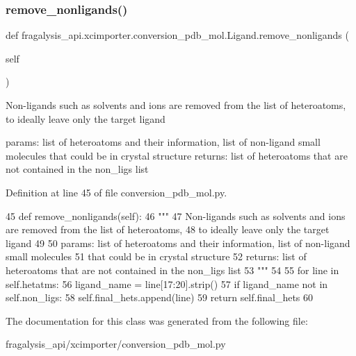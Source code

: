 \subsubsection{\texorpdfstring{remove\+\_\+nonligands()}{remove\_nonligands()}}
{\footnotesize\ttfamily def fragalysis\+\_\+api.\+xcimporter.\+conversion\+\_\+pdb\+\_\+mol.\+Ligand.\+remove\+\_\+nonligands (\begin{DoxyParamCaption}\item[{}]{self }\end{DoxyParamCaption})}

\begin{DoxyVerb}Non-ligands such as solvents and ions are removed from the list of heteroatoms,
to ideally leave only the target ligand

params: list of heteroatoms and their information, list of non-ligand small molecules
    that could be in crystal structure
returns: list of heteroatoms that are not contained in the non_ligs list
\end{DoxyVerb}
 

Definition at line 45 of file conversion\+\_\+pdb\+\_\+mol.\+py.


\begin{DoxyCode}
45     \textcolor{keyword}{def }remove\_nonligands(self):
46         \textcolor{stringliteral}{"""}
47 \textcolor{stringliteral}{        Non-ligands such as solvents and ions are removed from the list of heteroatoms,}
48 \textcolor{stringliteral}{        to ideally leave only the target ligand}
49 \textcolor{stringliteral}{}
50 \textcolor{stringliteral}{        params: list of heteroatoms and their information, list of non-ligand small molecules}
51 \textcolor{stringliteral}{            that could be in crystal structure}
52 \textcolor{stringliteral}{        returns: list of heteroatoms that are not contained in the non\_ligs list}
53 \textcolor{stringliteral}{        """}
54 
55         \textcolor{keywordflow}{for} line \textcolor{keywordflow}{in} self.hetatms:
56             ligand\_name = line[17:20].strip()
57             \textcolor{keywordflow}{if} ligand\_name \textcolor{keywordflow}{not} \textcolor{keywordflow}{in} self.non\_ligs:
58                 self.final\_hets.append(line)
59         \textcolor{keywordflow}{return} self.final\_hets
60 
\end{DoxyCode}


The documentation for this class was generated from the following file\+:\begin{DoxyCompactItemize}
\item 
fragalysis\+\_\+api/xcimporter/conversion\+\_\+pdb\+\_\+mol.\+py\end{DoxyCompactItemize}
